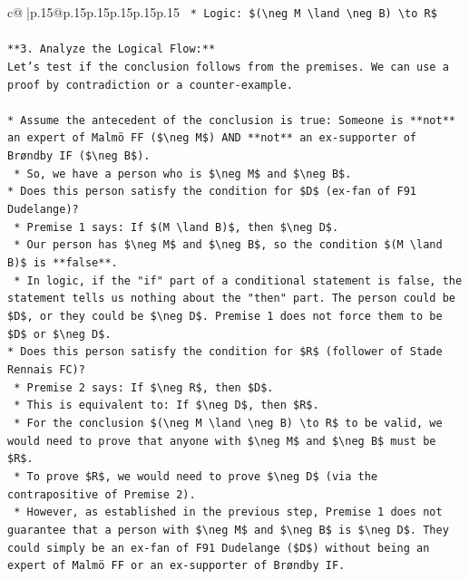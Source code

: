 \documentclass{article}
\begin{document}
{\begin{supertabular}{c@{$\;$}|p{.15\linewidth}@{}p{.15\linewidth}p{.15\linewidth}p{.15\linewidth}p{.15\linewidth}p{.15\linewidth}}
{{{\texttt{    *   Logic: \$(\textbackslash{}neg M \textbackslash{}land \textbackslash{}neg B) \textbackslash{}to R\$} \\
\\ 
\texttt{**3. Analyze the Logical Flow:**} \\
\texttt{Let's test if the conclusion follows from the premises. We can use a proof by contradiction or a counter{-}example.} \\
\\ 
\texttt{*   Assume the antecedent of the conclusion is true: Someone is **not** an expert of Malmö FF (\$\textbackslash{}neg M\$) AND **not** an ex{-}supporter of Brøndby IF (\$\textbackslash{}neg B\$).} \\
\texttt{    *   So, we have a person who is \$\textbackslash{}neg M\$ and \$\textbackslash{}neg B\$.} \\
\texttt{*   Does this person satisfy the condition for \$D\$ (ex{-}fan of F91 Dudelange)?} \\
\texttt{    *   Premise 1 says: If \$(M \textbackslash{}land B)\$, then \$\textbackslash{}neg D\$.} \\
\texttt{    *   Our person has \$\textbackslash{}neg M\$ and \$\textbackslash{}neg B\$, so the condition \$(M \textbackslash{}land B)\$ is **false**.} \\
\texttt{    *   In logic, if the "if" part of a conditional statement is false, the statement tells us nothing about the "then" part. The person could be \$D\$, or they could be \$\textbackslash{}neg D\$. Premise 1 does not force them to be \$D\$ or \$\textbackslash{}neg D\$.} \\
\texttt{*   Does this person satisfy the condition for \$R\$ (follower of Stade Rennais FC)?} \\
\texttt{    *   Premise 2 says: If \$\textbackslash{}neg R\$, then \$D\$.} \\
\texttt{    *   This is equivalent to: If \$\textbackslash{}neg D\$, then \$R\$.} \\
\texttt{    *   For the conclusion \$(\textbackslash{}neg M \textbackslash{}land \textbackslash{}neg B) \textbackslash{}to R\$ to be valid, we would need to prove that anyone with \$\textbackslash{}neg M\$ and \$\textbackslash{}neg B\$ must be \$R\$.} \\
\texttt{    *   To prove \$R\$, we would need to prove \$\textbackslash{}neg D\$ (via the contrapositive of Premise 2).} \\
\texttt{    *   However, as established in the previous step, Premise 1 does not guarantee that a person with \$\textbackslash{}neg M\$ and \$\textbackslash{}neg B\$ is \$\textbackslash{}neg D\$. They could simply be an ex{-}fan of F91 Dudelange (\$D\$) without being an expert of Malmö FF or an ex{-}supporter of Brøndby IF.} \\
}}}
\end{supertabular}}
\end{document}
